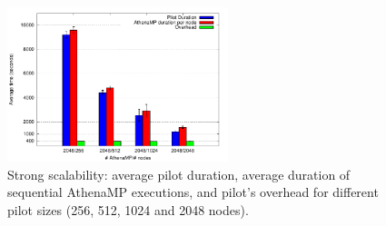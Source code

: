 \begin{figure}[!htb]
        \includegraphics[height=4.5cm,width=\columnwidth]{./figures/NGE/strong.pdf}
    \caption{Strong scalability:  average pilot duration, average duration of
    sequential AthenaMP executions, and pilot's overhead for different pilot
    sizes (256, 512, 1024 and 2048 nodes).}
\label{fig:strongScala}
\end{figure}

%

%
%

